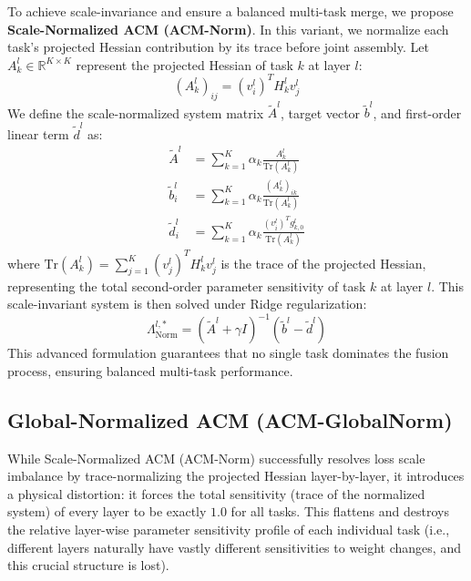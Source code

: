 To achieve scale-invariance and ensure a balanced multi-task merge, we propose \textbf{Scale-Normalized ACM (ACM-Norm)}. In this variant, we normalize each task's projected Hessian contribution by its trace before joint assembly. Let $A_k^l \in \mathbb{R}^{K \times K}$ represent the projected Hessian of task $k$ at layer $l$:
\begin{equation}
    (A_k^l)_{ij} = (v_i^l)^T H_k^l v_j^l
\end{equation}
We define the scale-normalized system matrix $\tilde{A}^l$, target vector $\tilde{b}^l$, and first-order linear term $\tilde{d}^l$ as:
\begin{align}
    \tilde{A}^l &= \sum_{k=1}^K \alpha_k \frac{A_k^l}{\text{Tr}(A_k^l)} \\
    \tilde{b}^l_i &= \sum_{k=1}^K \alpha_k \frac{(A_k^l)_{ik}}{\text{Tr}(A_k^l)} \\
    \tilde{d}^l_i &= \sum_{k=1}^K \alpha_k \frac{(v_i^l)^T g_{k,0}^l}{\text{Tr}(A_k^l)}
\end{align}
where $\text{Tr}(A_k^l) = \sum_{j=1}^K (v_j^l)^T H_k^l v_j^l$ is the trace of the projected Hessian, representing the total second-order parameter sensitivity of task $k$ at layer $l$. This scale-invariant system is then solved under Ridge regularization:
\begin{equation}
    \Lambda^{l, *}_{\text{Norm}} = (\tilde{A}^l + \gamma I)^{-1} (\tilde{b}^l - \tilde{d}^l)
\end{equation}
This advanced formulation guarantees that no single task dominates the fusion process, ensuring balanced multi-task performance.

\subsection{Global-Normalized ACM (ACM-GlobalNorm)}
While Scale-Normalized ACM (ACM-Norm) successfully resolves loss scale imbalance by trace-normalizing the projected Hessian layer-by-layer, it introduces a physical distortion: it forces the total sensitivity (trace of the normalized system) of every layer to be exactly $1.0$ for all tasks. This flattens and destroys the relative layer-wise parameter sensitivity profile of each individual task (i.e., different layers naturally have vastly different sensitivities to weight changes, and this crucial structure is lost).

